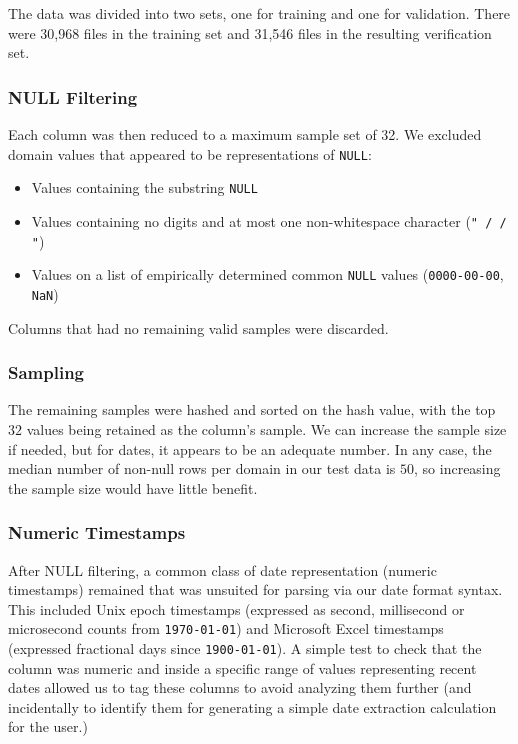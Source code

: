 The data was divided into two sets, one for training and one for validation. There were 30,968 files in the training set and 31,546 files in the resulting verification set.


\subsubsection{NULL Filtering}
Each column was then reduced to a maximum sample set of 32. We excluded domain values that appeared to be representations of \texttt{NULL}:
\begin{itemize}
\item Values containing the substring \texttt{NULL}
\item Values containing no digits and at most one non-whitespace character (\eg \texttt{" / / "})
\item Values on a list of empirically determined common \texttt{NULL} values (\eg \texttt{0000-00-00}, \texttt{NaN})
\end{itemize}
Columns that had no remaining valid samples were discarded. 

\subsubsection{Sampling}
The remaining samples were hashed and sorted on the hash value, with the top $32$ values being retained as the column's sample. We can increase the sample size if needed, but for dates, it appears to be an adequate number. In any case, the median number of non-null rows per domain in our test data is $50$, so increasing the sample size would have little benefit.

\subsubsection{Numeric Timestamps}
After NULL filtering, a common class of date representation (numeric timestamps) remained that was unsuited for parsing via our date format syntax. This included Unix epoch timestamps (expressed as second, millisecond or microsecond counts from \texttt{1970-01-01}) and Microsoft Excel timestamps (expressed fractional days since \texttt{1900-01-01}). A simple test to check that the column was numeric and inside a specific range of values representing recent dates allowed us to tag these columns to avoid analyzing them further (and incidentally to identify them for generating a simple date extraction calculation for the user.)


